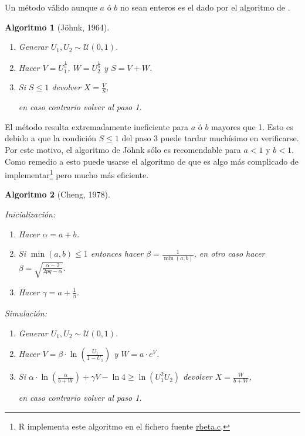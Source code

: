 \documentclass[
  10pt,
]{book}
\theoremstyle{break}
\newtheorem{conjecture}{Algoritmo}[chapter]
\theoremstyle{nonumberplain}
\let\oldfootnote\footnote
\renewcommand\footnote[1]{\oldfootnote{\hspace{2mm}#1}}
\begin{document}
Un método válido aunque \(a\) ó \(b\) no sean enteros es el dado por el algoritmo de \citet{johnk1964}.

\begin{conjecture}[Jöhnk, 1964]
\protect\hypertarget{cnj:johnk}{}\label{cnj:johnk}

\begin{enumerate}
\def\labelenumi{\arabic{enumi}.}
\item
  Generar \(U_1, U_2\sim \mathcal{U}(0, 1)\).
\item
  Hacer \(V = U_1^{\frac1a}\), \(W = U_2^{\frac1b}\) y \(S = V+W\).
\item
  Si \(S \leq 1\) devolver \(X = \frac VS\),

  en caso contrario volver al paso 1.
\end{enumerate}

\end{conjecture}

El método resulta extremadamente ineficiente para \(a\) ó \(b\) mayores que 1.
Esto es debido a que la condición \(S\leq1\) del paso 3 puede tardar muchísimo en verificarse.
Por este motivo, el algoritmo de Jöhnk sólo es recomendable para \(a<1\) y \(b<1\).
Como remedio a esto puede usarse el algoritmo de \citet{cheng1978} que es algo más complicado de implementar\footnote{R implementa este algoritmo en el fichero fuente \href{https://svn.r-project.org/R/trunk/src/nmath/rbeta.c}{rbeta.c}.} pero mucho más eficiente.

\begin{conjecture}[Cheng, 1978]
\protect\hypertarget{cnj:cheng}{}\label{cnj:cheng}

Inicialización:

\begin{enumerate}
\def\labelenumi{\arabic{enumi}.}
\item
  Hacer \(\alpha = a + b\).
\item
  Si \(\min(a,b) \leq1\) entonces hacer \(\beta=\frac1{\min( a,b)}\), en otro caso hacer \(\beta=\sqrt{\frac{\alpha-2}{2pq-\alpha}}\).
\item
  Hacer \(\gamma=a+\frac1\beta\).
\end{enumerate}

Simulación:

\begin{enumerate}
\def\labelenumi{\arabic{enumi}.}
\item
  Generar \(U_1, U_2\sim \mathcal{U}(0, 1)\).
\item
  Hacer \(V=\beta\cdot\ln\left( \frac{U_1}{1-U_1}\right)\) y \(W=a\cdot e^{V}\).
\item
  Si \(\alpha\cdot\ln\left( \frac\alpha{b+W}\right) +\gamma V-\ln4 \ge \ln\left( U_1^{2}U_2\right)\) devolver \(X=\frac W{b+W}\),

  en caso contrario volver al paso 1.
\end{enumerate}

\end{conjecture}
\end{document}
